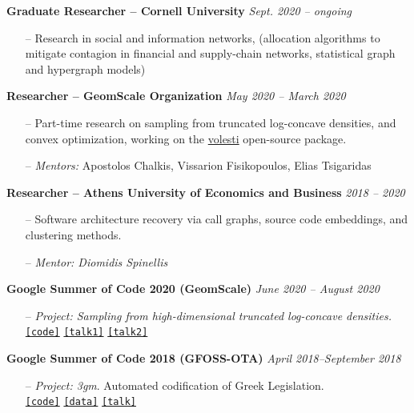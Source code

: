 \documentclass[margin]{res}
\newcommand{\specialurl}[2]{\href {#2} {\texttt{[#1]}}}
\newcommand{\code}[1]{\specialurl {code} {#1}}
\newcommand{\data}[1]{\specialurl {data} {#1}}
\newcommand{\talk}[1]{\specialurl {talk} {#1}}
\begin{document}
\begin{resume}
\textbf{Graduate Researcher -- Cornell University} \hfill \emph{Sept. 2020 -- ongoing}
\begin{itemize}[nosep]
	\item[--] Research in social and information networks, (allocation algorithms to mitigate contagion in financial and supply-chain networks, statistical graph and hypergraph models)
\end{itemize}


\textbf{Researcher -- GeomScale Organization} \hfill \emph{May 2020 -- March 2020}

\begin{itemize}[nosep]
	\item[--] Part-time research on sampling from truncated log-concave densities, and convex optimization, working on the \href{https://github.com/GeomScale/volesti}{volesti} open-source package.
	\item[--] \emph{Mentors:} Apostolos Chalkis, Vissarion Fisikopoulos, Elias Tsigaridas
\end{itemize}


\textbf{Researcher -- Athens University of Economics and Business} \hfill \emph{2018 -- 2020}
\begin{itemize}[nosep]
\item[--] Software architecture recovery via call graphs, source code embeddings, and clustering methods.
\item[--] \emph{Mentor: Diomidis Spinellis}
\end{itemize}

\textbf{Google Summer of Code 2020 (GeomScale)}  \hfill \emph{June 2020 -- August 2020}
\begin{itemize}[nosep]
\item[--] \emph{Project: Sampling from high-dimensional truncated log-concave densities.} \\ \code{https://GeomScale/volesti} \specialurl{talk1}{https://www.youtube.com/watch?v=P7YfC8Nn6sY} \specialurl{talk2}{https://www.cs.utah.edu/~jeffp/WaGoML/index.html}
\end{itemize}

\textbf{Google Summer of Code 2018 (GFOSS-OTA)}  \hfill {\emph{April 2018--September 2018}}
\begin{itemize}[nosep]
\item[--] \emph{Project: 3gm}. Automated codification of Greek Legislation. \\ \code{https://github.com/eellak/gsoc2018-3gm} \data{https://archive.org/details/greekgovernmentgazette} \talk{https://www.youtube.com/watch?v=_UIGsy85Ehw}
\end{itemize}


\end{resume}
\end{document}
